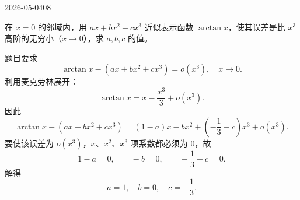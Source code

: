 \begin{mistake}{2026-05-04}{08}

\begin{problemcontent}
在 \(x=0\) 的邻域内，用 \(ax+bx^2+cx^3\) 近似表示函数 \(\arctan x\)，使其误差是比 \(x^3\) 高阶的无穷小（\(x\to 0\)），求 \(a,b,c\) 的值。
\end{problemcontent}

\begin{solutioncontent}
题目要求
\[
\arctan x-(ax+bx^2+cx^3)=o(x^3),\quad x\to 0.
\]
利用麦克劳林展开：
\[
\arctan x=x-\frac{x^3}{3}+o(x^3).
\]
因此
\[
\arctan x-(ax+bx^2+cx^3)
=(1-a)x-bx^2+\left(-\frac13-c\right)x^3+o(x^3).
\]
要使该误差为 \(o(x^3)\)，\(x\)、\(x^2\)、\(x^3\) 项系数都必须为 \(0\)，故
\[
1-a=0,\qquad -b=0,\qquad -\frac13-c=0.
\]
解得
\[
\boxed{a=1,\quad b=0,\quad c=-\frac13}.
\]
\end{solutioncontent}


\end{mistake}
